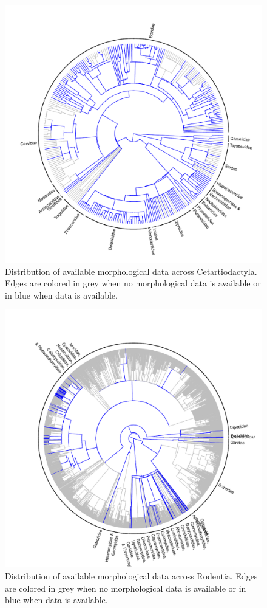 \documentclass[12pt,letterpaper]{article}
\begin{document}
\begin{figure}[!htbp]
\centering
    \includegraphics[width=1\textwidth]{Supp_figure_CETARTIODACTYLA.pdf}
\caption{Distribution of available morphological data across Cetartiodactyla. Edges are colored in grey when no morphological data is available or in blue when data is available.}
\label{Supp_Figure_Phylo-Primates}
\end{figure}

\begin{figure}[!htbp]
\centering
    \includegraphics[width=1\textwidth]{Supp_figure_RODENTIA.pdf}
\caption{Distribution of available morphological data across Rodentia. Edges are colored in grey when no morphological data is available or in blue when data is available.}
\label{Supp_Figure_Phylo-Rodentia}
\end{figure}
\end{document}
